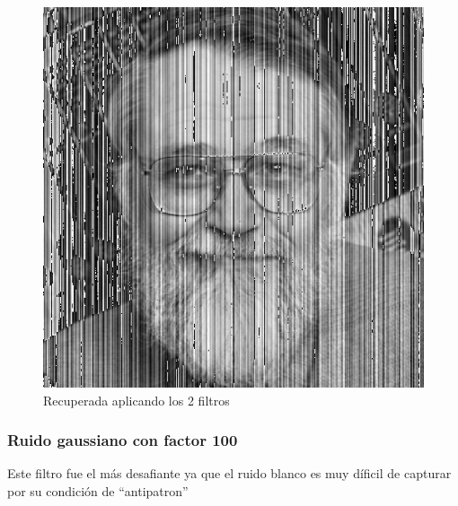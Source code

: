 \begin{figure}[H]
\begin {center}
\includegraphics[width=360pt]{imagenes/kern-sin1000-recovered.png}
\end {center}
\caption{Recuperada aplicando los 2 filtros}
\label{fig:SinProm}
\end{figure}


\subsubsection{Ruido gaussiano con factor 100}

Este filtro fue el m\'as desafiante ya que el ruido blanco es muy d\'ificil de
capturar por su condici\'on de ``antipatron''

